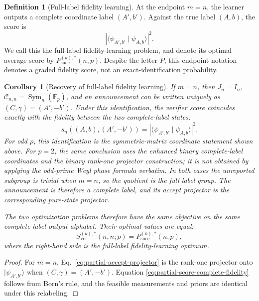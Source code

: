 \documentclass[11pt]{article}
\newcommand{\F}{\mathbb F}
\newcommand{\Sym}{\operatorname{Sym}}
\newcommand{\1}{\mathbf 1}
\newcommand{\ket}[1]{\lvert #1\rangle}
\newcommand{\braket}[2]{\langle #1\mid #2\rangle}
\theoremstyle{plain}
\newtheorem{corollary}[theorem]{Corollary}
\theoremstyle{definition}
\newtheorem{definition}[theorem]{Definition}
\theoremstyle{remark}
\begin{document}
\begin{definition}[Full-label fidelity learning]
At the endpoint $m=n$, the learner outputs a complete coordinate label
$(A',b')$.  Against the true label $(A,b)$, the score is
\begin{equation}
 \left|\braket{\psi_{A',b'}}{\psi_{A,b}}\right|^2.
 \label{eq:full-label-fidelity-score}
\end{equation}
We call this the full-label fidelity-learning problem, and denote its optimal
average score by $P_{\mathrm{succ}}^{(k),*}(n,p)$.  Despite the letter $P$,
this endpoint notation denotes a graded fidelity score, not an
exact-identification probability.
\end{definition}
\begin{corollary}[Recovery of full-label fidelity learning]
\label{cor:complete-fidelity-endpoint}
If $m=n$, then $J_n=I_n$,
$\mathcal C_{n,n}=\Sym_n(\F_p)$, and an announcement can be written uniquely
as $(C,\gamma)=(A',-b')$.  Under this identification, the verifier score
coincides exactly with the fidelity between the two complete-label states:
\begin{equation}
 s_n((A,b),(A',-b'))
 =\left|\braket{\psi_{A',b'}}{\psi_{A,b}}\right|^2.
 \label{eq:partial-score-complete-fidelity}
\end{equation}
For odd $p$, this identification is the symmetric-matrix coordinate statement
shown above.  For $p=2$, the same conclusion uses the enhanced binary
complete-label coordinates and the binary rank-one projector construction;
it is not obtained by applying the odd-prime Weyl phase formula verbatim.
In both cases the unreported subgroup is trivial when $m=n$, so the quotient
is the full label group.  The announcement is therefore a complete label,
and its accept projector is the corresponding pure-state projector.

The two optimization problems therefore have the same objective on the same
complete-label output alphabet.  Their optimal values are equal:
\begin{equation}
 S_{\mathrm{ver}}^{(k),*}(n,n;p)
 =P_{\mathrm{succ}}^{(k),*}(n,p),
 \label{eq:partial-complete-optimal-equality}
\end{equation}
where the right-hand side is the full-label fidelity-learning optimum.
\end{corollary}

\begin{proof}
For $m=n$, Eq.~\eqref{eq:partial-accept-projector} is the rank-one projector
onto $\ket{\psi_{A',b'}}$ when $(C,\gamma)=(A',-b')$.  Equation
\eqref{eq:partial-score-complete-fidelity} follows from Born's rule, and the
feasible measurements and priors are identical under this relabeling.
\end{proof}
\end{document}
